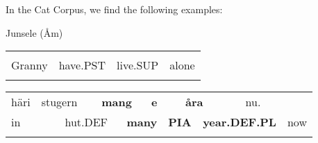 \begin{styleBodyTextFirst}
In the Cat Corpus, we find the following examples:

\end{styleBodyTextFirst}


\begin{listWWNumileveli}
\item {}

\begin{styleExample}
Junsele (Åm)

\end{styleExample}

\end{listWWNumileveli}

\begin{listWWNumxxxixleveli}
\item {}

\end{listWWNumxxxixleveli}

\begin{tabular}{llll}
\lsptoprule
\multicolumn{4}{l}{Momma

}\\
Granny & have.PST & live.SUP & alone\\
\lspbottomrule
\end{tabular}

\begin{tabular}{llllllllllll}
\lsptoprule
häri & \multicolumn{2}{l}{stugern

} & \multicolumn{2}{l}{{\bfseries mang}

} & \multicolumn{2}{l}{{\bfseries e}

} & \multicolumn{2}{l}{{\bfseries åra}

} & \multicolumn{2}{l}{nu.

} & \\
\multicolumn{2}{l}{in

} & \multicolumn{2}{l}{hut.DEF

} & \multicolumn{2}{l}{{\bfseries many}

} & \multicolumn{2}{l}{{\bfseries PIA}

} & \multicolumn{2}{l}{{\bfseries year.DEF.PL}

} & \multicolumn{2}{l}{now

}\\
\lspbottomrule
\end{tabular}

